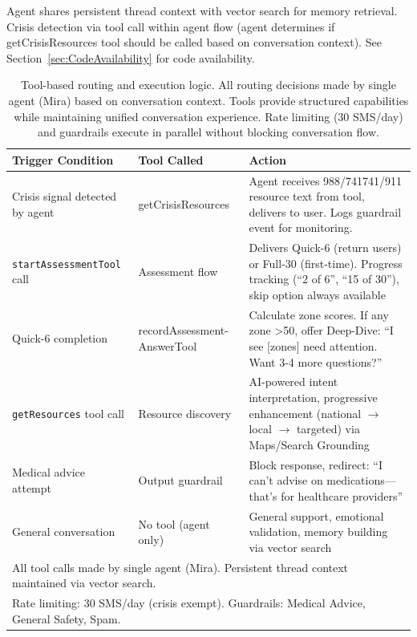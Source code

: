 \documentclass{article}
\begin{document}
Agent shares persistent thread context with vector search for memory retrieval. Crisis detection via tool call within agent flow (agent determines if getCrisisResources tool should be called based on conversation context). See Section~\ref{sec:CodeAvailability} for code availability.

\begin{table}[htbp]
\centering
\caption{Tool-based routing and execution logic. All routing decisions made by single agent (Mira) based on conversation context. Tools provide structured capabilities while maintaining unified conversation experience. Rate limiting (30 SMS/day) and guardrails execute in parallel without blocking conversation flow.}
\label{tab:tool-routing}
\small
\begin{tabular}{p{3cm}p{2.5cm}p{6cm}}
\toprule
\textbf{Trigger Condition} & \textbf{Tool Called} & \textbf{Action} \\
\midrule
Crisis signal detected by agent & getCrisisResources & Agent receives 988/741741/911 resource text from tool, delivers to user. Logs guardrail event for monitoring. \\
\midrule
\texttt{startAssessmentTool} call & Assessment flow & Delivers Quick-6 (return users) or Full-30 (first-time). Progress tracking (``2 of 6'', ``15 of 30''), skip option always available \\
\midrule
Quick-6 completion & recordAssessment-AnswerTool & Calculate zone scores. If any zone >50, offer Deep-Dive: ``I see [zones] need attention. Want 3-4 more questions?'' \\
\midrule
\texttt{getResources} tool call & Resource discovery & AI-powered intent interpretation, progressive enhancement (national $\rightarrow$ local $\rightarrow$ targeted) via Maps/Search Grounding \\
\midrule
Medical advice attempt & Output guardrail & Block response, redirect: ``I can't advise on medications—that's for healthcare providers'' \\
\midrule
General conversation & No tool (agent only) & General support, emotional validation, memory building via vector search \\
\bottomrule
\multicolumn{3}{l}{\footnotesize All tool calls made by single agent (Mira). Persistent thread context maintained via vector search.} \\
\multicolumn{3}{l}{\footnotesize Rate limiting: 30 SMS/day (crisis exempt). Guardrails: Medical Advice, General Safety, Spam.}
\end{tabular}
\end{table}
\end{document}
